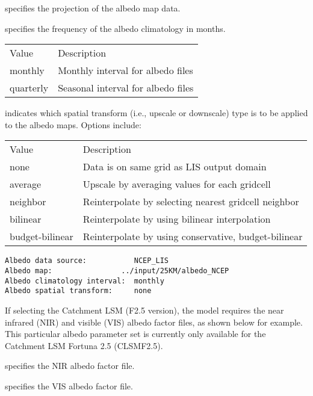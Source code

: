   specifies the projection of the
 albedo map data.

  specifies the frequency of the
 albedo climatology in months.

 \begin{tabular}{ll}
 Value     & Description                        \\
 monthly   & Monthly interval for albedo files  \\
 quarterly & Seasonal interval for albedo files \\
 \end{tabular}

  indicates which spatial transform
 (i.e., upscale or downscale) type is to be applied to the albedo
 maps.  Options include:

 \begin{tabular}{ll}
 Value           & Description                                          \\
 none            & Data is on same grid as LIS output domain            \\
 average         & Upscale by averaging values for each gridcell        \\
 neighbor        & Reinterpolate by selecting nearest gridcell neighbor \\
 bilinear        & Reinterpolate by using bilinear interpolation        \\
 budget-bilinear & Reinterpolate by using conservative, budget-bilinear \\
 \end{tabular}
 

 \begin{Verbatim}[frame=single]
Albedo data source:           NCEP_LIS
Albedo map:                ../input/25KM/albedo_NCEP 
Albedo climatology interval:  monthly  
Albedo spatial transform:     none
 \end{Verbatim}

 
 If selecting the Catchment LSM (F2.5 version), the model requires the
 near infrared (NIR) and visible (VIS) albedo factor files, as shown
 below for example. 
 This particular albedo parameter set is currently only available for the
 Catchment LSM Fortuna 2.5 (CLSMF2.5).

  specifies the NIR albedo factor file. 

  specifies the VIS albedo factor file. 

